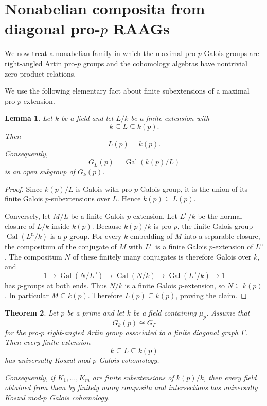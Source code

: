 \documentclass[12pt]{amsart}
\theoremstyle{plain}
\newtheorem{theorem}{Theorem}[section]
\newtheorem{lemma}[theorem]{Lemma}
\theoremstyle{definition}
\theoremstyle{remark}
\numberwithin{equation}{section}
\begin{document}
\section{Nonabelian composita from diagonal pro-\texorpdfstring{\(p\)}{p} RAAGs}
\label{sec:raag-composita}

We now treat a nonabelian family in which the maximal pro-\(p\) Galois
groups are right-angled Artin pro-\(p\) groups and the cohomology algebras
have nontrivial zero-product relations.

We use the following elementary fact about finite subextensions of a
maximal pro-\(p\) extension.

\begin{lemma}
\label{lem:persistence}
Let \(k\) be a field and let \(L/k\) be a finite extension with
\[
k\subseteq L\subseteq k(p).
\]
Then
\[
L(p)=k(p).
\]
Consequently,
\[
G_L(p)=\operatorname{Gal}(k(p)/L)
\]
is an open subgroup of \(G_k(p)\).
\end{lemma}

\begin{proof}
Since \(k(p)/L\) is Galois with pro-\(p\) Galois group, it is the union
of its finite Galois \(p\)-subextensions over \(L\). Hence
\(k(p)\subseteq L(p)\).

Conversely, let \(M/L\) be a finite Galois \(p\)-extension. Let
\(L^{\mathrm n}/k\) be the normal closure of \(L/k\) inside \(k(p)\).
Because \(k(p)/k\) is pro-\(p\), the finite Galois group
\(\operatorname{Gal}(L^{\mathrm n}/k)\) is a \(p\)-group. For every
\(k\)-embedding of \(M\) into a separable closure, the compositum of
the conjugate of \(M\) with \(L^{\mathrm n}\) is a finite Galois
\(p\)-extension of \(L^{\mathrm n}\). The compositum \(N\) of these
finitely many conjugates is therefore Galois over \(k\), and
\[
1\longrightarrow \operatorname{Gal}(N/L^{\mathrm n})
\longrightarrow \operatorname{Gal}(N/k)
\longrightarrow \operatorname{Gal}(L^{\mathrm n}/k)
\longrightarrow 1
\]
has \(p\)-groups at both ends. Thus \(N/k\) is a finite Galois
\(p\)-extension, so \(N\subseteq k(p)\). In particular
\(M\subseteq k(p)\). Therefore \(L(p)\subseteq k(p)\), proving the
claim.
\end{proof}

\begin{theorem}
\label{thm:raag-lattice}
Let \(p\) be a prime and let \(k\) be a field containing \(\mu_p\).
Assume that
\[
G_k(p)\cong G_\Gamma
\]
for the pro-\(p\) right-angled Artin group associated to a finite
diagonal graph \(\Gamma\). Then every finite extension
\[
k\subseteq L\subseteq k(p)
\]
has universally Koszul mod-\(p\) Galois cohomology.

Consequently, if \(K_1,\dots,K_m\) are finite subextensions of
\(k(p)/k\), then every field obtained from them by finitely many
composita and intersections has universally Koszul mod-\(p\) Galois
cohomology.
\end{theorem}
\end{document}
